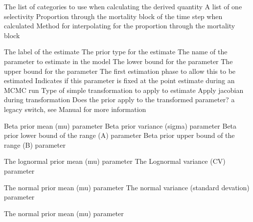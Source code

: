  {The list of categories to use when calculating the derived quantity}
 {A list of one selectivity}
 {Proportion through the mortality block of the time step when calculated}
 {Method for interpolating for the proportion through the mortality block}
\par\textbf{}\par
\par\textbf{}\par
{}\par\par
{} {The label of the estimate}
 {The prior type for the estimate}
 {The name of the parameter to estimate in the model}
 {The lower bound for the parameter}
 {The upper bound for the parameter}
 {The first estimation phase to allow this to be estimated}
 {Indicates if this parameter is fixed at the point estimate during an MCMC run}
 {Type of simple transformation to apply to estimate}
 {Apply jacobian during transformation}
 {Does the prior apply to the transformed parameter? a legacy switch, see Manual for more information}
\par\textbf{}\par
{} {Beta prior  mean (mu) parameter}
 {Beta prior variance (sigma) parameter}
 {Beta prior lower bound of the range (A) parameter}
 {Beta prior upper bound of the range (B) parameter}
\par\textbf{}\par
{} {The lognormal prior mean (mu) parameter}
 {The Lognormal variance (CV) parameter}
\par\textbf{}\par
{} {The normal prior mean (mu) parameter}
 {The normal variance (standard devation) parameter}
\par\textbf{}\par
{} {The normal prior mean (mu) parameter}
